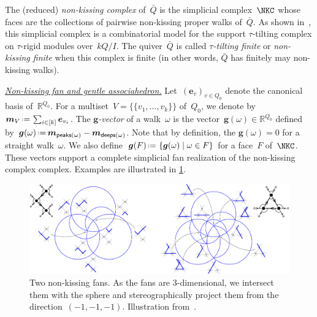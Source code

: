 \documentclass{amsart}
\theoremstyle{definition}
\newcommand{\R}{\mathbb{R}} %
\renewcommand{\b}[1]{{\boldsymbol{#1}}} %
\newcommand{\set}[2]{\left\{ #1 \;\middle|\; #2 \right\}} %
\newcommand{\eqdef}{\mbox{\,\raisebox{0.2ex}{\scriptsize\ensuremath{\mathrm:}}\ensuremath{=}\,}} %
\newcommand{\darkblue}{\color{darkblue}} %
\newcommand{\defn}[1]{\textsl{\darkblue #1}} %
\newcommand{\para}[1]{\medskip\noindent\uline{\textit{#1.}}} %
\newcommand{\vincent}[1]{\todo[color=blue!30]{#1 \\ \hfill --- V.}}
\newcommand{\multiplicityVector}{\b{m}} %
\newcommand{\gvector}[1]{\b{g}(#1)} %
\newcommand{\gvectors}[1]{\b{g}(#1)} %
\newcommand{\quiver}{\bar Q} %
\newcommand{\peaks}[1]{\mathsf{peaks}(#1)} %
\newcommand{\deeps}[1]{\mathsf{deeps}(#1)} %
\begin{document}
%
The (reduced) \defn{non-kissing complex} of~$\quiver$ is the simplicial complex~$\NKC$ whose faces are the collections of pairwise non-kissing proper walks of~$\quiver$.
As shown in~\cite[Thm.~2.46]{PaluPilaudPlamondon-nonkissing}, this simplicial complex is a combinatorial model for the support $\tau$-tilting complex on $\tau$-rigid modules over~$kQ/I$.
The quiver~$\quiver$ is called \defn{$\tau$-tilting finite} or \defn{non-kissing finite} when this complex is finite (in other words, $\quiver$ has finitely may non-kissing walks).

\para{Non-kissing fan and gentle associahedron}
%
Let~$(\b{e}_v)_{v \in Q_0}$ denote the canonical basis of~$\R^{Q_0}$.
For a multiset~$V = \{\!\{v_1, \dots, v_k\}\!\}$ of~$Q_0$, we denote by $\multiplicityVector_V \eqdef \sum_{i \in [k]} \b{e}_{v_i}$.
The \defn{$\b{g}$-vector} of a walk~$\omega$ is the vector~$\gvector{\omega} \in \R^{Q_0}$ defined by~$\gvector{\omega} \eqdef \multiplicityVector_{\peaks{\omega}} - \multiplicityVector_{\deeps{\omega}}$.
Note that by definition, the $\gvector{\omega} = 0$ for a straight walk~$\omega$.
We also define~$\gvectors{F} \eqdef \set{\gvector{\omega}}{\omega \in F}$ for a face~$F$ of~$\NKC$.
These vectors support a complete simplicial fan realization of the non-kissing complex complex.
Examples are illustrated in \cref{fig:nonkissingFans}.
\vincent{Define $\b{c}$-vectors}

\begin{figure}[h]
	\capstart
	\centerline{\includegraphics[scale=.45]{nonkissingFans}}
	\caption{Two non-kissing fans. As the fans are $3$-dimensional, we intersect them with the sphere and stereographically project them from the direction~$(-1,-1,-1)$. Illustration from~\cite{PaluPilaudPlamondon-nonkissing}.}
	\label{fig:nonkissingFans}
\end{figure}
\end{document}
